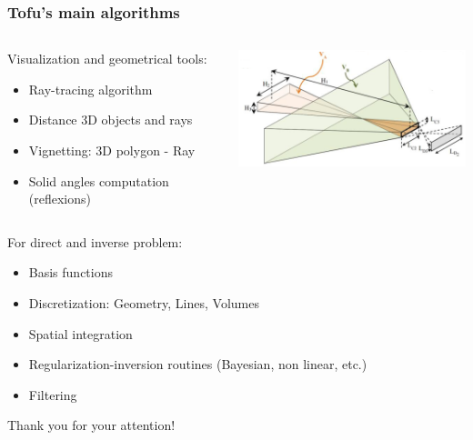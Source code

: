 \documentclass[10pt]{beamer}
\begin{document}
\begin{frame}
\frametitle{Tofu's main algorithms}


\begin{columns}
\begin{column}{0.6\textwidth}
Visualization and geometrical tools:
	\begin{itemize}
	\item Ray-tracing algorithm
	\item Distance 3D objects and rays
	\item Vignetting: 3D polygon - Ray%
	\item Solid angles computation (reflexions)
	\end{itemize}
\end{column}
\begin{column}{0.4\textwidth}

\begin{center}
    	\hspace{-0.5cm}\includegraphics[width=\linewidth]{figures/cones.png}
\end{center}
\end{column}
\end{columns}

\vspace{0.2cm}
For direct and inverse problem:
\begin{itemize}
	\item Basis functions
	\item Discretization: Geometry, Lines, Volumes
	\item Spatial integration
	\item Regularization-inversion routines (Bayesian, non linear, etc.)
	\item Filtering
	\end{itemize}
\end{frame}

\begin{frame}
\centering
\Huge{Thank you for your attention!}
\end{frame}
\end{document}
